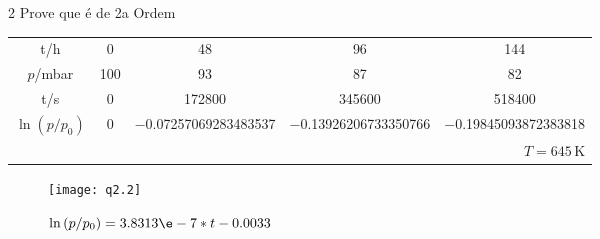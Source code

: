 \documentclass[\mainfilename]{subfiles}
\begin{document}
\begin{questionBox}
    \begin{questionBox}2{ %
        Prove que é de 2a Ordem
    } %
        \begin{center}
            \begin{tabular}{c *{4}{c}}
                
                \\\toprule
                
                    \multicolumn{1}{c}{t/\unit{\hour}}
                    & 0 & 48 & 96 & 144
                    \\
                    \multicolumn{1}{c}{\(p\)/\unit{\milli\bar}}
                    & 100 & 93 & 87 & 82

                \\\midrule

                    \multicolumn{1}{c}{t/\unit{\second}}
                    & 0 & 172800 & 345600 & 518400
                    \\
                    \multicolumn{1}{c}{\(\ln{(p/p_0)}\)}
                    & 0
                    & \num{-0.07257069283483537}
                    & \num{-0.13926206733350766}
                    & \num{-0.19845093872383818}

                    
                \\\bottomrule
                \multicolumn{5}{r}{\(T=645\,\unit{\kelvin}\)}
                
            \end{tabular}
            \begin{figure}\centering
                \texttt{[image: q2.2]}
                \caption{\(\ln{(p/p_0)} = 3.8313\e-7*t - 0.0033\)}
            \end{figure}
        \end{center}
    \end{questionBox}
\end{questionBox}
\end{document}
